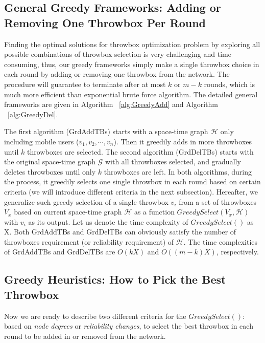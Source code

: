 \documentclass[10pt,conference,compsocconf,letterpaper]{IEEEtran}
\begin{document}
\subsection{General Greedy Frameworks: Adding or Removing One Throwbox Per Round}

Finding the optimal solutions for throwbox optimization problem by exploring all possible combinations of throwbox selection  is very challenging and time consuming, thus, our greedy frameworks simply make a single throwbox choice in each round by adding or removing one throwbox from the network. The procedure will guarantee to terminate after at most $k$ or $m-k$ rounds, which is much more efficient than exponential brute force algorithm. The detailed general frameworks are given in Algorithm ~\ref{alg:GreedyAdd} and Algorithm ~\ref{alg:GreedyDel}.

The first algorithm (GrdAddTBs) starts with a space-time graph $\mathcal{H}$ only including mobile users ($v_1,v_2,\cdots,v_n$). Then it greedily adds in more throwboxes until $k$ throwboxes are selected. The second algorithm (GrdDelTBs) starts with the original space-time graph $\mathcal{G}$ with all throwboxes selected, and gradually deletes throwboxes until only $k$ throwboxes are left. In both algorithms, during the process, it greedily selects one single throwbox  in each round based on certain criteria (we will introduce different criteria in the next subsection). Hereafter, we generalize such greedy selection of a single throwbox $v_i$ from a set of throwboxes $V_{x}$ based on current space-time graph $\mathcal{H}$ as a function $GreedySelect(V_{x},\mathcal{H})$ with $v_i$ as its output. Let us denote the time complexity of $GreedySelect()$ as X. Both GrdAddTBs and GrdDelTBs can obviously satisfy the number of throwboxes requirement (or reliability requirement) of $\mathcal{H}$. The time complexities of GrdAddTBs and GrdDelTBs are $O(kX)$ and $O((m-k)X)$, respectively.

\subsection{Greedy Heuristics: How to Pick the Best Throwbox}

Now we are ready to describe two different criteria for the $GreedySelect()$: based on \emph{node degrees} or \emph{reliability changes}, to select the best throwbox in each round to be added in or removed from the network.
\end{document}
